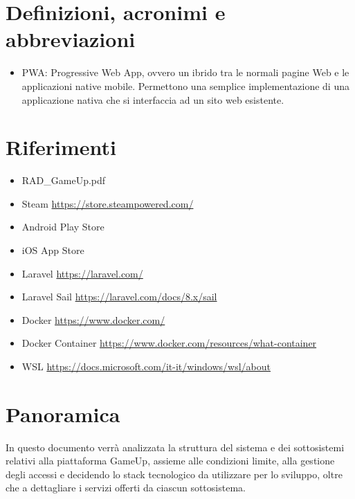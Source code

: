 \section{Definizioni, acronimi e abbreviazioni}
\begin{itemize}
	\item PWA: Progressive Web App, ovvero un ibrido tra le normali pagine Web e le applicazioni native mobile. Permettono una semplice implementazione di una applicazione nativa che si interfaccia ad un sito web esistente.
\end{itemize}

\section{Riferimenti}
\begin{itemize}
	\item RAD\_GameUp.pdf
	\item Steam \url{https://store.steampowered.com/}
	\item Android Play Store
	\item iOS App Store
	\item Laravel \url{https://laravel.com/}
	\item Laravel Sail \url{https://laravel.com/docs/8.x/sail}
	\item Docker \url{https://www.docker.com/}
	\item Docker Container \url{https://www.docker.com/resources/what-container}
	\item WSL \url{https://docs.microsoft.com/it-it/windows/wsl/about}
\end{itemize}

\section{Panoramica}
In questo documento verrà analizzata la struttura del sistema e dei sottosistemi relativi alla piattaforma GameUp, assieme alle condizioni limite, alla gestione degli accessi e decidendo lo stack tecnologico da utilizzare per lo sviluppo, oltre che a dettagliare i servizi offerti da ciascun sottosistema.